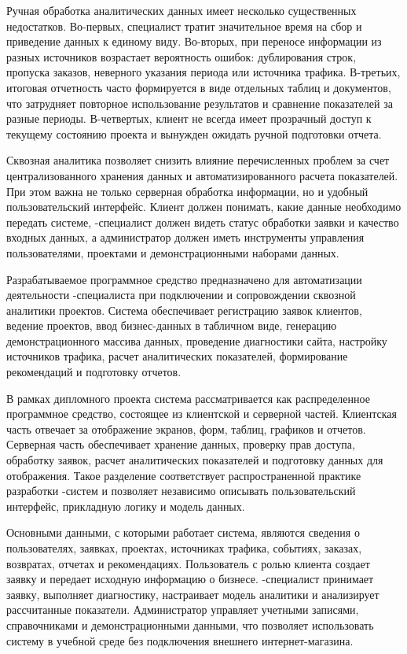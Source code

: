 Ручная обработка аналитических данных имеет несколько существенных недостатков. Во-первых, специалист тратит значительное время на сбор и приведение данных к единому виду. Во-вторых, при переносе информации из разных источников возрастает вероятность ошибок: дублирования строк, пропуска заказов, неверного указания периода или источника трафика. В-третьих, итоговая отчетность часто формируется в виде отдельных таблиц и документов, что затрудняет повторное использование результатов и сравнение показателей за разные периоды. В-четвертых, клиент не всегда имеет прозрачный доступ к текущему состоянию проекта и вынужден ожидать ручной подготовки отчета.

Сквозная аналитика позволяет снизить влияние перечисленных проблем за счет централизованного хранения данных и автоматизированного расчета показателей. При этом важна не только серверная обработка информации, но и удобный пользовательский интерфейс. Клиент должен понимать, какие данные необходимо передать системе, -специалист должен видеть статус обработки заявки и качество входных данных, а администратор должен иметь инструменты управления пользователями, проектами и демонстрационными наборами данных.

Разрабатываемое программное средство предназначено для автоматизации деятельности -специалиста при подключении и сопровождении сквозной аналитики  проектов. Система обеспечивает регистрацию заявок клиентов, ведение проектов, ввод бизнес-данных в табличном виде, генерацию демонстрационного массива данных, проведение диагностики сайта, настройку источников трафика, расчет аналитических показателей, формирование рекомендаций и подготовку отчетов.

В рамках дипломного проекта система рассматривается как распределенное программное средство, состоящее из клиентской и серверной частей. Клиентская часть отвечает за отображение экранов, форм, таблиц, графиков и отчетов. Серверная часть обеспечивает хранение данных, проверку прав доступа, обработку заявок, расчет аналитических показателей и подготовку данных для отображения. Такое разделение соответствует распространенной практике разработки -систем и позволяет независимо описывать пользовательский интерфейс, прикладную логику и модель данных.

Основными данными, с которыми работает система, являются сведения о пользователях, заявках, проектах, источниках трафика, событиях, заказах, возвратах, отчетах и рекомендациях. Пользователь с ролью клиента создает заявку и передает исходную информацию о бизнесе. -специалист принимает заявку, выполняет диагностику, настраивает модель аналитики и анализирует рассчитанные показатели. Администратор управляет учетными записями, справочниками и демонстрационными данными, что позволяет использовать систему в учебной среде без подключения внешнего интернет-магазина.

